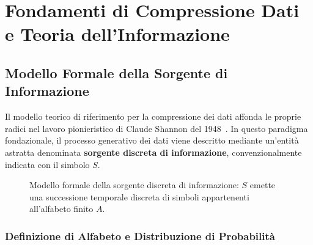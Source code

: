 \chapter{Fondamenti di Compressione Dati e Teoria dell'Informazione}
\label{ch:fondamenti-compressione-teoria-informazione}

\FloatBarrier
\section{Modello Formale della Sorgente di Informazione}
\label{sec:modello-sorgente-informazione}

Il modello teorico di riferimento per la compressione dei dati affonda le proprie radici nel lavoro pionieristico di Claude Shannon del 1948~\cite{shannon1948}. In questo paradigma fondazionale, il processo generativo dei dati viene descritto mediante un'entit\`a astratta denominata \textbf{sorgente discreta di informazione}, convenzionalmente indicata con il simbolo $S$.

\begin{figure}[H]
\centering
{}
\caption{Modello formale della sorgente discreta di informazione: $S$ emette una successione temporale discreta di simboli appartenenti all'alfabeto finito $A$.}
\label{fig:modello-sorgente-shannon}
\end{figure}

\FloatBarrier
\subsection{Definizione di Alfabeto e Distribuzione di Probabilit\`a}
\label{subsec:alfabeto-distribuzione}

